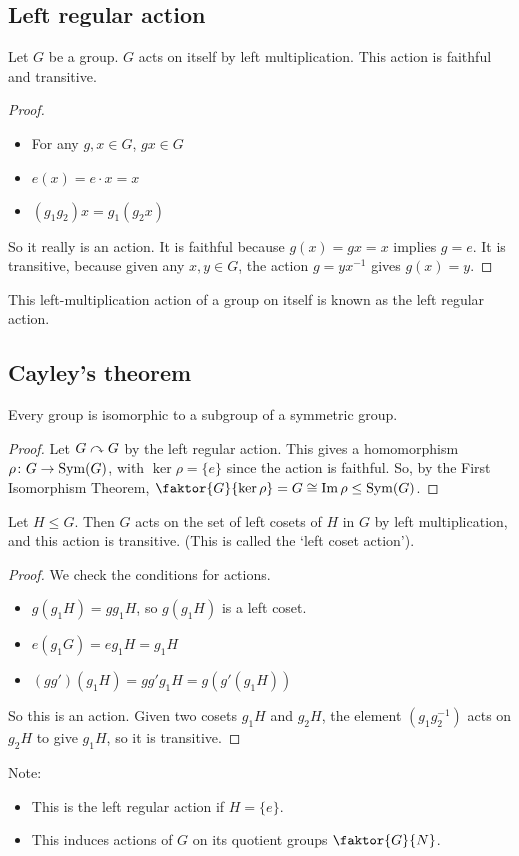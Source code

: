 \subsection{Left regular action}
\begin{lemma}
	Let \(G\) be a group.
	\(G\) acts on itself by left multiplication.
	This action is faithful and transitive.
\end{lemma}
\begin{proof}
	\begin{itemize}
		\item For any \(g, x \in G\), \(gx \in G\)
		\item \(e(x) = e \cdot x = x\)
		\item \((g_1 g_2) x = g_1 (g_2 x)\)
	\end{itemize}
	So it really is an action.
	It is faithful because \(g(x) = gx = x\) implies \(g = e\).
	It is transitive, because given any \(x, y \in G\), the action \(g = yx^{-1}\) gives \(g(x) = y\).
\end{proof}
\begin{definition}
	This left-multiplication action of a group on itself is known as the left regular action.
\end{definition}

\subsection{Cayley's theorem}
\begin{theorem}
	Every group is isomorphic to a subgroup of a symmetric group.
\end{theorem}
\begin{proof}
	Let \(G \curvearrowright G\) by the left regular action.
	This gives a homomorphism \(\rho\colon G \to \operatorname{Sym}(G)\), with \(\ker \rho = \{ e \}\) since the action is faithful.
	So, by the First Isomorphism Theorem, \(\faktor{G}{\ker \rho} = G \cong \Im \rho \leq \Sym(G)\).
\end{proof}

\begin{proposition}
	Let \(H \leq G\).
	Then \(G\) acts on the set of left cosets of \(H\) in \(G\) by left multiplication, and this action is transitive.
	(This is called the `left coset action').
\end{proposition}
\begin{proof}
	We check the conditions for actions.
	\begin{itemize}
		\item \(g(g_1H) = gg_1H\), so \(g(g_1H)\) is a left coset.
		\item \(e(g_1G) = eg_1H = g_1H\)
		\item \((gg')(g_1H) = gg'g_1H = g(g'(g_1H))\)
	\end{itemize}
	So this is an action.
	Given two cosets \(g_1H\) and \(g_2H\), the element \((g_1g_2^{-1})\) acts on \(g_2H\) to give \(g_1H\), so it is transitive.
\end{proof}
Note:
\begin{itemize}
	\item This is the left regular action if \(H = \{ e \}\).
	\item This induces actions of \(G\) on its quotient groups \(\faktor{G}{N}\).
\end{itemize}
